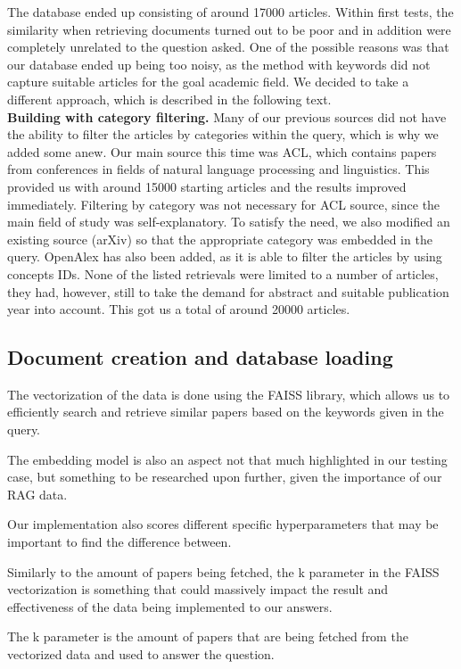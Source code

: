 \documentclass[fleqn,moreauthors,10pt]{ds_report}
\begin{document}
The database ended up consisting of around 17000 articles. Within first tests, the similarity when retrieving documents turned out to be poor and in addition were completely unrelated to the question asked. One of the possible reasons was that our database ended up being too noisy, as the method with keywords did not capture suitable articles for the goal academic field. We decided to take a different approach, which is described in the following text.
\\
\textbf{Building with category filtering.} Many of our previous sources did not have the ability to filter the articles by categories within the query, which is why we added some anew. Our main source this time was ACL, which contains papers from conferences in fields of natural language processing and linguistics. This provided us with around 15000 starting articles and the results improved immediately. Filtering by category was not necessary for ACL source, since the main field of study was self-explanatory. To satisfy the need, we also modified an existing source (arXiv) so that the appropriate category was embedded in the query. OpenAlex has also been added, as it is able to filter the articles by using concepts IDs. None of the listed retrievals were limited to a number of articles, they had, however, still to take the demand for abstract and suitable publication year into account. This got us a total of around 20000 articles.

\subsection*{Document creation and database loading}
The vectorization of the data is done using the FAISS library, which allows us to efficiently search and retrieve similar papers based on the keywords given in the query.

The embedding model is also an aspect not that much highlighted in our testing case, but something to be researched upon further, given the importance of our RAG data.

Our implementation also scores different specific hyperparameters that may be important to find the difference between.

Similarly to the amount of papers being fetched, the k parameter in the FAISS vectorization is something that could massively impact the result and effectiveness of the data being implemented to our answers.

The k parameter is the amount of papers that are being fetched from the vectorized data and used to answer the question.
\end{document}
